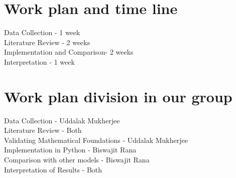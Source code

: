\documentclass[11pt, oneside]{article}   	%
\begin{document}
\section{Work plan and time line}

Data Collection - 1 week
\\Literature Review - 2 weeks
\\Implementation and Comparison- 2 weeks
\\Interpretation - 1 week


\section{Work plan division in our group}

Data Collection - Uddalak Mukherjee
\\Literature Review - Both
\\Validating Mathematical Foundations - Uddalak Mukherjee
\\Implementation in Python - Biswajit Rana
\\Comparison with other models - Biswajit Rana
\\Interpretation of Results - Both









\nocite{*}%
	

\end{document}
